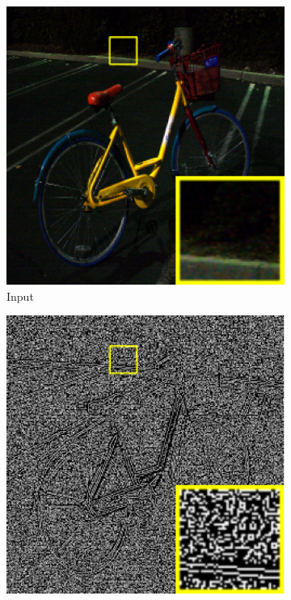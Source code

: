 \documentclass[a4paper]{ctexart}
\begin{document}
	\begin{figure}[htb]
		\centering
		\begin{subfigure}{0.25\columnwidth}
			\includegraphics[width=\linewidth]{picture/LLIE/Structure Modeling and Guidance/Input}
			\captionsetup{font=scriptsize}
			\caption{Input}
			\label{fig: Input}
		\end{subfigure}
		\begin{subfigure}{0.25\columnwidth}
			\includegraphics[width=\linewidth]{picture/LLIE/Structure Modeling and Guidance/Structure of (a)}

\end{subfigure}
\end{figure}
\end{document}
